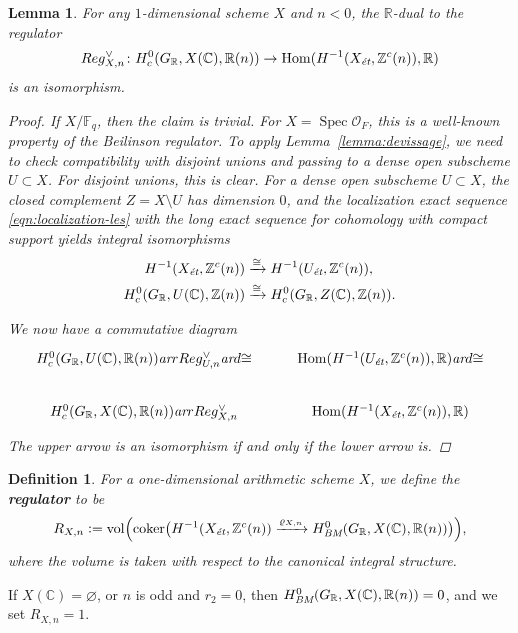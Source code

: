 \documentclass[draft]{article}
\DeclareMathOperator{\coker}{coker}
\DeclareMathOperator{\Hom}{Hom}
\DeclareMathOperator{\Spec}{Spec}
\DeclareMathOperator{\vol}{vol}
\newcommand{\CC}{\mathbb{C}}
\newcommand{\FF}{\mathbb{F}}
\newcommand{\RR}{\mathbb{R}}
\newcommand{\ZZ}{\mathbb{Z}}
\renewcommand{\emptyset}{\varnothing}
\newcommand{\ar}{\text{\it ar}}
\newcommand{\BM}{\text{\it BM}}
\newcommand{\et}{\text{\it \'{e}t}}
\newcommand{\dfn}{\mathrel{\mathop:}=}
\theoremstyle{myplain}
\newtheorem{lemma}[theorem]{Lemma}
\theoremstyle{mydefinition}
\newtheorem{definition}[theorem]{Definition}
\begin{document}
\begin{lemma}
  \label{lemma:regulator-isomorphism}
  For any $1$-dimensional scheme $X$ and $n < 0$, the $\RR$-dual to the
  regulator
  \[ Reg_{X,n}^\vee\colon H^0_c (G_\RR, X(\CC), \RR(n)) \to
    \Hom (H^{-1} (X_\et, \ZZ^c (n)), \RR) \]
  is an isomorphism.

  \begin{proof}
    If $X/\FF_q$, then the claim is trivial. For $X = \Spec \mathcal{O}_F$, this
    is a well-known property of the Beilinson regulator. To apply
    Lemma~\ref{lemma:devissage}, we need to check compatibility with disjoint
    unions and passing to a dense open subscheme $U \subset X$. For disjoint
    unions, this is clear. For a dense open subscheme $U \subset X$, the closed
    complement $Z = X\setminus U$ has dimension $0$, and the localization exact
    sequence \eqref{eqn:localization-les} with the long exact sequence for
    cohomology with compact support yields integral isomorphisms
    \begin{align*}
      H^{-1} (X_\et, \ZZ^c (n)) & \xrightarrow{\cong} H^{-1} (U_\et, \ZZ^c (n)), \\
      H^0_c (G_\RR, U(\CC), \ZZ(n)) & \xrightarrow{\cong} H^0_c (G_\RR, Z(\CC), \ZZ(n)).
    \end{align*}

    We now have a commutative diagram
    \[ \begin{tikzcd}
        H^0_c (G_\RR, U(\CC), \RR(n)) \ar{r}{Reg_{U,n}^\vee} \ar{d}{\cong} &
        \Hom (H^{-1} (U_\et, \ZZ^c (n)), \RR) \ar{d}{\cong} \\
        H^0_c (G_\RR, X(\CC), \RR(n)) \ar{r}{Reg_{X,n}^\vee} &
        \Hom (H^{-1} (X_\et, \ZZ^c (n)), \RR)
      \end{tikzcd} \]
    The upper arrow is an isomorphism if and only if the lower arrow is.
  \end{proof}
\end{lemma}

\begin{definition}
  \label{dfn:regulator}
  For a one-dimensional arithmetic scheme $X$, we define the \textbf{regulator}
  to be
  \[ R_{X,n} \dfn \vol \Bigl(\coker \bigl(
    H^{-1} (X_\et, \ZZ^c (n)) \xrightarrow{\varrho_{X,n}}
    H^0_\BM (G_\RR, X(\CC), \RR(n))
    \bigr)\Bigr), \]
  where the volume is taken with respect to the canonical integral structure.
\end{definition}

If $X(\CC) = \emptyset$, or $n$ is odd and $r_2 = 0$, then
$H^0_\BM (G_\RR, X(\CC), \RR (n)) = 0$, and we set $R_{X,n} = 1$.
\end{document}
